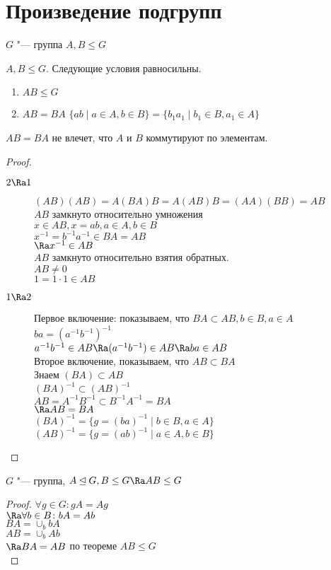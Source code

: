 ﻿\section{Произведение подгрупп}
$G$ "--- группа $A, B \le G$\\
\begin{theorem}
$A, B \le G$. Следующие условия равносильны.\\
    \begin{enumerate}
    \item $AB \le G$\\
    \item $AB = BA$
    $\{ab \mid a \in  A, b \in B\} = \{b_1a_1 \mid b_1 \in B, a_1 \in A\}$\\
    \end{enumerate}
\end{theorem}
\begin{Rem}
$AB = BA$ не влечет, что $A$ и $B$ коммутируют по элементам.
\end{Rem}
\begin{proof}
\begin{description}
\item[$2 \Ra 1$]
$(AB)(AB) = A(BA)B = A(AB)B = (AA)(BB) = AB$\\
$AB$ замкнуто относительно умножения\\
$x \in AB, x = ab, a\in A, b \in B$\\
$x^{-1} = b^{-1}a^{-1} \in BA = AB$\\
$\Ra x^{-1} \in AB$\\
$AB$ замкнуто относительно взятия обратных.\\
$AB \ne 0$\\
$1 = 1\cdot1 \in AB$\\

\item[$1 \Ra 2$]
Первое включение: показываем, что
$BA \subset AB, b \in B, a \in A$\\
$ba = (a^{-1}b^{-1})^{-1}$\\
$a^{-1}b^{-1} \in AB \Ra (a^{-1}b^{-1}) \in AB \Ra ba \in AB$\\

Второе включение, показываем, что
$AB \subset BA$\\
Знаем $(BA) \subset AB$\\
$(BA)^{-1} \subset (AB)^{-1}$\\
$AB = A^{-1}B^{-1} \subset B^{-1}A^{-1} = BA$\\
$\Ra AB = BA$\\

$(BA)^{-1} = \{g = (ba)^{-1}\mid b \in B, a \in A\}$\\
$(AB)^{-1} = \{g = (ab)^{-1}\mid a \in A, b \in B\}$\\
\end{description}
\end{proof}
\begin{conseq}
$G$ "--- группа, $A \unlhd G, B \le G \Ra AB \le G$ \\
\end{conseq}
\begin{proof}
$\forall g \in G\colon gA = Ag$\\
$\Ra \forall b \in B\colon bA = Ab$\\

$BA = \cup_b bA$\\
$AB = \cup_b Ab$\\
$\Ra BA = AB$ по теореме $AB \le G$\\
\end{proof}
